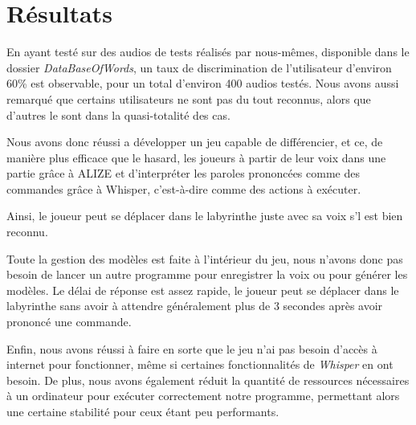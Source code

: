 \section{Résultats}
\label{sec:resultats}

En ayant testé sur des audios de tests réalisés par nous-mêmes, disponible dans le dossier \textit{DataBaseOfWords}, un taux de discrimination de l'utilisateur d'environ 60\% est observable, pour un total d'environ 400 audios testés. Nous avons aussi remarqué que certains utilisateurs ne sont pas du tout reconnus, alors que d'autres le sont dans la quasi-totalité des cas.

Nous avons donc réussi a développer un jeu capable de différencier, et ce, de manière plus efficace que le hasard, les joueurs à partir de leur voix dans une partie grâce à ALIZE et d'interpréter les paroles prononcées comme des commandes grâce à Whisper, c'est-à-dire comme des
actions à exécuter. 

Ainsi, le joueur peut se déplacer dans le labyrinthe juste avec sa voix s'l est bien reconnu. 

Toute la gestion des modèles est faite à l'intérieur du jeu, nous n'avons donc pas besoin de lancer un autre programme pour enregistrer la voix ou pour générer les modèles. 
Le délai de réponse est assez rapide, le joueur peut se déplacer dans le labyrinthe sans avoir à attendre généralement plus de 3 secondes après avoir prononcé une commande. 

Enfin, nous avons réussi à faire en sorte que le jeu n'ai pas besoin d'accès à internet pour fonctionner, même si certaines fonctionnalités de \textit{Whisper} en ont besoin.
De plus, nous avons également réduit la quantité de ressources nécessaires à un ordinateur pour exécuter correctement notre programme, permettant alors une certaine stabilité pour ceux étant peu performants.
